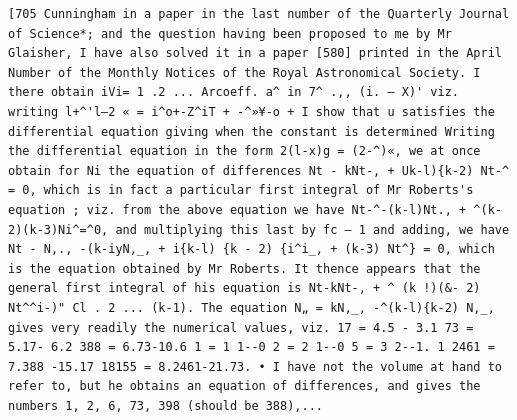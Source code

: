 \documentclass[12pt]{article}
\theoremstyle{plain}
\begin{document}
\newpage
\setcounter{page}{580}
\begin{verbatim}
[705 Cunningham in a paper in the last number of the Quarterly Journal of Science*; and the question having been proposed to me by Mr Glaisher, I have also solved it in a paper [580] printed in the April Number of the Monthly Notices of the Royal Astronomical Society. I there obtain iVi= 1 .2 ... Arcoeff. a^ in 7^ .,, (i. — X)' viz. writing l+^'l—2 « = i^o+-Z^iT + -^»¥-o + I show that u satisfies the differential equation giving when the constant is determined Writing the differential equation in the form 2(l-x)g = (2-^)«, we at once obtain for Ni the equation of differences Nt - kNt-, + Uk-l){k-2) Nt-^ = 0, which is in fact a particular first integral of Mr Roberts's equation ; viz. from the above equation we have Nt-^-(k-l)Nt., + ^(k-2)(k-3)Ni^=^0, and multiplying this last by fc — 1 and adding, we have Nt - N,., -(k-iyN,_, + i{k-l) {k - 2) {i^i_, + (k-3) Nt^} = 0, which is the equation obtained by Mr Roberts. It thence appears that the general first integral of his equation is Nt-kNt-, + ^ (k !)(&- 2) Nt^^i-)" Cl . 2 ... (k-1). The equation N„ = kN,_, -^(k-l){k-2) N,_, gives very readily the numerical values, viz. 17 = 4.5 - 3.1 73 = 5.17- 6.2 388 = 6.73-10.6 1 = 1 1--0 2 = 2 1--0 5 = 3 2--1. 1 2461 = 7.388 -15.17 18155 = 8.2461-21.73. • I have not the volume at hand to refer to, but he obtains an equation of differences, and gives the numbers 1, 2, 6, 73, 398 (should be 388),... 
\end{verbatim}
\end{document}
